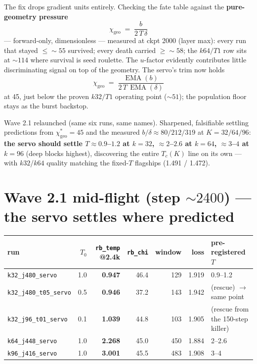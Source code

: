 \documentclass[11pt,a4paper]{article}
\newcommand{\code}[1]{\texttt{#1}}
\newcommand{\chigeo}{\chi_{\mathrm{geo}}}
\newcommand{\EMA}{\operatorname{EMA}}
\newcommand{\ok}{\checkmark}
\begin{document}
The fix drops gradient units entirely. Checking the fate table against the
\textbf{pure-geometry pressure}
\[
  \chigeo \;=\; \frac{b}{2\,T\,\delta}
\]
--- forward-only, dimensionless --- measured at ckpt 2000 (layer max): every
run that stayed $\le{\sim}55$ survived; every death carried $\ge{\sim}58$; the
$k64/T1$ row sits at ${\sim}114$ where survival is seed roulette. The
$u$-factor evidently contributes little discriminating signal on top of the
geometry. The servo's trim now holds
\[
  \chigeo \;=\; \frac{\EMA(b)}{2\,T\,\EMA(\delta)}
\]
at 45, just below the proven $k32/T1$ operating point (${\sim}51$); the
population floor stays as the burst backstop.

Wave 2.1 relaunched (same six runs, same names). Sharpened, falsifiable
settling predictions from $\chigeo^{*} = 45$ and the measured
$b/\delta \approx 80/212/319$ at $K = 32/64/96$: \textbf{the servo should
settle $T \approx 0.9$--$1.2$ at $k{=}32$, $\approx 2$--$2.6$ at $k{=}64$,
$\approx 3$--$4$ at $k{=}96$} (deep blocks highest), discovering the entire
$T_c(K)$ line on its own --- with $k32$/$k64$ quality matching the fixed-$T$
flagships (1.491 / 1.472).

\section{Wave 2.1 mid-flight (step ${\sim}2400$) --- the servo settles where
predicted}

\begin{center}\small
\begin{tabular}{lrrrrrl}
\toprule
run & $T_0$ & \code{rb\_temp} @2.4k & \code{rb\_chi} & window & loss &
pre-registered $T$ \\
\midrule
\code{k32\_j480\_servo} & 1.0 & \textbf{0.947} & 46.4 & 129 & 1.919 &
0.9--1.2 \ok \\
\code{k32\_j480\_t05\_servo} & 0.5 & \textbf{0.946} & 37.2 & 143 & 1.942 &
(rescue) $\to$ same point \ok \\
\code{k32\_j96\_t01\_servo} & 0.1 & \textbf{1.039} & 44.8 & 103 & 1.905 &
(rescue from the 150-step killer) \ok\ok \\
\code{k64\_j448\_servo} & 1.0 & \textbf{2.268} & 45.0 & 450 & 1.884 &
2--2.6 \ok \\
\code{k96\_j416\_servo} & 1.0 & \textbf{3.001} & 45.5 & 483 & 1.908 &
3--4 \ok \\
\bottomrule
\end{tabular}
\end{center}
\end{document}
